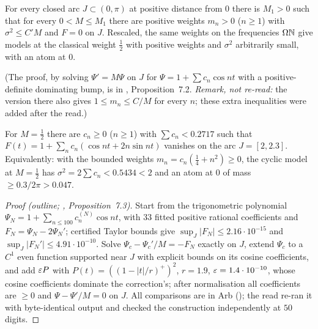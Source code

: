 \begin{proposition}[\rd{1 read}]\label{prop:model72}
For every closed arc $J\subset(0,\pi)$ at positive distance from $0$ there is $M_1>0$ such that for every $0<M\le M_1$ there are positive weights $m_n>0$ ($n\ge1$) with $\sigma^2\le C'M$ and $F=0$ on $J$. Rescaled, the same weights on the frequencies $\Omega\mathbb N$ give models at the classical weight $\frac12$ with positive weights and $\sigma^2$ arbitrarily small, with an atom at $0$.
\end{proposition}

(The proof, by solving $\Psi'=M\Psi$ on $J$ for $\Psi=1+\sum c_n\cos nt$ with a positive-definite dominating bump, is in , Proposition~7.2. \emph{Remark, not re-read:} the version there also gives $1\le m_n\le C/M$ for every $n$; these extra inequalities were added after the read.)

\begin{proposition}\label{prop:model73}
For $M=\frac12$ there are $c_n\ge0$ ($n\ge1$) with $\sum c_n<0.2717$ such that $F(t)=1+\sum_nc_n(\cos nt+2n\sin nt)$ vanishes on the arc $J=[2,2.3]$. Equivalently: with the bounded weights $m_n=c_n(\frac14+n^2)\ge0$, the cyclic model at $M=\frac12$ has $\sigma^2=2\sum c_n<0.5434<2$ and an atom at $0$ of mass $\ge0.3/2\pi>0.047$.
\end{proposition}

\begin{proof}[Proof (outline; , Proposition~7.3)]
Start from the trigonometric polynomial $\Psi_N=1+\sum_{n\le100}c^{(N)}_n\cos nt$, with $33$ fitted positive rational coefficients and $F_N=\Psi_N-2\Psi_N'$; certified Taylor bounds give $\sup_J|F_N|\le2.16\cdot10^{-15}$ and $\sup_J|F_N'|\le4.91\cdot10^{-10}$. Solve $\Psi_c-\Psi_c'/M=-F_N$ exactly on $J$, extend $\Psi_c$ to a $C^1$ even function supported near $J$ with explicit bounds on its cosine coefficients, and add $\varepsilon P$ with $P(t)=((1-|t|/r)^+)^2$, $r=1.9$, $\varepsilon=1.4\cdot10^{-10}$, whose cosine coefficients dominate the correction's; after normalisation all coefficients are $\ge0$ and $\Psi-\Psi'/M=0$ on $J$. All comparisons are in Arb (); the read re-ran it with byte-identical output and checked the construction independently at $50$ digits.
\end{proof}

